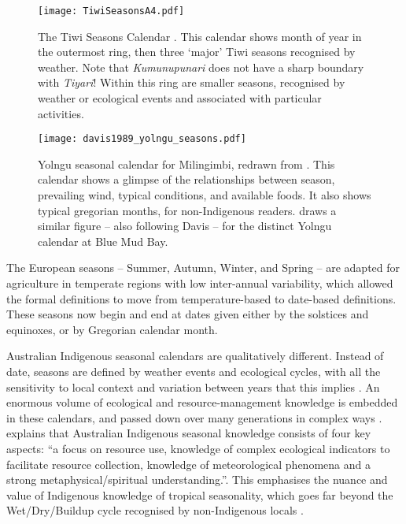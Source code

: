 \begin{sidewaysfigure}
    \vspace{0.3in}
    \centerline{ \texttt{[image: TiwiSeasonsA4.pdf]} }
    \caption[The Tiwi Seasons Calendar \citep{CSIROcals}]{
        The Tiwi Seasons Calendar \citep{CSIROcals}.
        This calendar shows month of year in the outermost ring,
        then three `major' Tiwi seasons recognised by weather.
        Note that \textit{Kumunupunari} does not have a sharp boundary with \textit{Tiyari}!
        Within this ring are smaller seasons, recognised by weather
        or ecological events and associated with particular activities.
        }
    \label{fig:tiwi-seasons}
\end{sidewaysfigure}

\begin{SCfigure}[][bth]
    \centering
    \texttt{[image: davis1989\_yolngu\_seasons.pdf]}
    \caption[Yolngu seasonal calendar for Milingimbi \citep{davis1989}]{
        Yolngu seasonal calendar for Milingimbi, redrawn from \citet[p2]{davis1989}.
        This calendar shows a glimpse of the relationships between season,
        prevailing wind, typical conditions, and available foods.
        It also shows typical gregorian months, for non-Indigenous readers.
        \citet[][p.107]{barber2005} draws a similar figure -- also following
        Davis -- for the distinct Yolngu calendar at Blue Mud Bay.
        }
    \label{fig:yolngu-seasons}
\end{SCfigure}


The European seasons -- Summer, Autumn, Winter, and Spring -- are adapted for
agriculture in temperate regions with low inter-annual variability, which
allowed the formal definitions to move from temperature-based to date-based
definitions.  These seasons now begin and end at dates given either by the
solstices and equinoxes, or by Gregorian calendar month.


Australian Indigenous seasonal calendars are qualitatively different.
Instead of date, seasons are defined by weather events and ecological cycles,
with all the sensitivity to local context and variation between years that
this implies \citep[eg.][]{davis1989}.  An enormous volume of ecological and
resource-management knowledge is embedded in these calendars, and passed
down over many generations in complex ways \citep{barber2005}.
%
\citet{woodward2012b} explains that Australian Indigenous seasonal knowledge
consists of four key aspects: ``a focus on resource use, knowledge of complex
ecological indicators to facilitate resource collection, knowledge of
meteorological phenomena and a strong metaphysical/spiritual understanding.''.
This emphasises the nuance and value of Indigenous knowledge of tropical
seasonality, which goes far beyond the Wet/Dry/Buildup cycle recognised
by non-Indigenous locals \citep{kingsley2003}.


